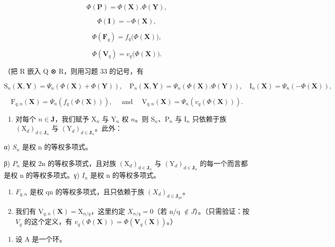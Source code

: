 \[
\Phi (\mathbf {P}) = \Phi (\mathbf {X}). \Phi (\mathbf {Y}),
\]

\[
\Phi (\mathbf {I}) = - \Phi (\mathbf {X}),
\]

\[
\Phi (\mathbf {F} _ {q}) = f _ {q} \big (\Phi (\mathbf {X}) \big),
\]

\[
\Phi (\mathbf {V} _ {q}) = v _ {q} \bigl (\Phi (\mathbf {X}) \bigr).
\]

（把 R 嵌入 Q ⊗ R，则用习题 33 的记号，有

\[
\mathrm{S} _ {n} (\mathbf {X}, \mathbf {Y}) = \Psi_ {n} (\Phi (\mathbf {X}) + \Phi (\mathbf {Y})), \quad \mathrm{P} _ {n} (\mathbf {X}, \mathbf {Y}) = \Psi_ {n} (\Phi (\mathbf {X}). \Phi (\mathbf {Y})), \quad \mathrm{I} _ {n} (\mathbf {X}) = \Psi_ {n} (- \Phi (\mathbf {X})),
\]

\[
\mathrm{F} _ {q, n} (\mathbf {X}) = \Psi_ {n} \left(f _ {q} (\Phi (\mathbf {X}))\right), \quad \text { and } \quad \mathrm{V} _ {q, n} (\mathbf {X}) = \Psi_ {n} \left(v _ {q} (\Phi (\mathbf {X}))\right).
\]

\begin{enumerate}
\def\labelenumi{\alph{enumi})}
\setcounter{enumi}{1}
\tightlist
\item
  对每个 \(n \in \mathbf{J}\)，我们赋予 \(\mathrm{X}_{n}\) 与 \(\mathrm{Y}_{n}\) 权 \(n\)。则 \(\mathrm{S}_{n}\)、\(\mathrm{P}_{n}\) 与 \(\mathrm{I}_{n}\) 只依赖于族 \((\mathrm{X}_{d})_{d \in \mathbf{J}_{n}}\) 与 \((\mathrm{Y}_{d})_{d \in \mathbf{J}_{n}}\)。此外：
\end{enumerate}

α) \(S_{n}\) 是权 n 的等权多项式。

β) \(P_{n}\) 是权 2n 的等权多项式，且对族 \((\mathrm{X}_{d})_{d\in\mathbf{J}_{n}}\) 与 \((\mathrm{Y}_{d})_{d\in\mathbf{J}_{n}}\) 的每一个而言都是权 n 的等权多项式。γ) \(I_{n}\) 是权 n 的等权多项式。

\begin{enumerate}
\def\labelenumi{\alph{enumi})}
\setcounter{enumi}{2}
\tightlist
\item
  \(F_{q,n}\) 是权 qn 的等权多项式，且只依赖于族 \((X_{d})_{d\in\mathbf{J}_{qn}}\)。
\item
  我们有 \(\mathrm{V}_{q,n}(\mathbf{X}) = \mathrm{X}_{n/q}\)，这里约定 \(X_{n/q} = 0\)（若 n/q \(\notin J\)）。（只需验证：按 \(V_{q}\) 的这个定义，有 \(v_{q}(\Phi(\mathbf{X})) = \Phi(\mathbf{V}_{q}(\mathbf{X}))\)。）
\end{enumerate}

\begin{enumerate}
\def\labelenumi{\arabic{enumi})}
\setcounter{enumi}{34}
\tightlist
\item
  设 A 是一个环。
\end{enumerate}

